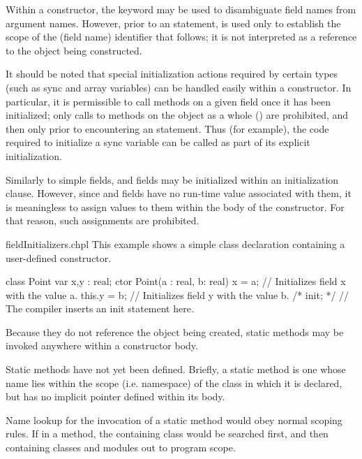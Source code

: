 Within a constructor, the  keyword may be used to disambiguate field
names from argument names.  However, prior to an  statement, 
 is used only to establish the scope of the (field name) identifier
that follows; it is not interpreted as a reference to the object being constructed.

\begin{note}
It should be noted that special initialization actions required by certain types
(such as sync and array variables) can be handled easily within a constructor.
In particular, it is permissible to call
methods on a given field once it has been initialized; only calls to methods on
the object as a whole () are prohibited, and then only prior to
encountering an  statement.  Thus (for example), the code required to
initialize a sync variable can be called as part of its explicit initialization.
\end{note}

Similarly to simple fields, 
and  fields may be initialized within an initialization clause.
However, since  and  fields have no run-time value
associated with them, it is meaningless to assign values to them within the body
of the constructor.  For that reason, such assignments are prohibited.

\begin{chapelexample}{fieldInitializers.chpl}
This example shows a simple class declaration containing a user-defined constructor.
\begin{chapel}
class Point { 
  var x,y : real; 
  ctor Point(a : real, b: real)
  { x = a;          // Initializes field x with the value a.
    this.y = b;     // Initializes field y with the value b.
    /* init; */     // The compiler inserts an init statement here.
  }
}
\end{chapel}
\end{chapelexample}
\noindent
Because they do not reference the object being created, static methods may be
invoked anywhere within a constructor body.

\begin{future}
Static methods have not yet been defined.  Briefly, a static method is one whose
name lies within the scope (i.e. namespace) of the class in which it is
declared, but has no implicit  pointer defined within its body.

Name lookup for the invocation of a static method would obey normal scoping
rules.  If in a method, the containing class would be searched first, and then
containing classes and modules out to program scope.
\end{future}

